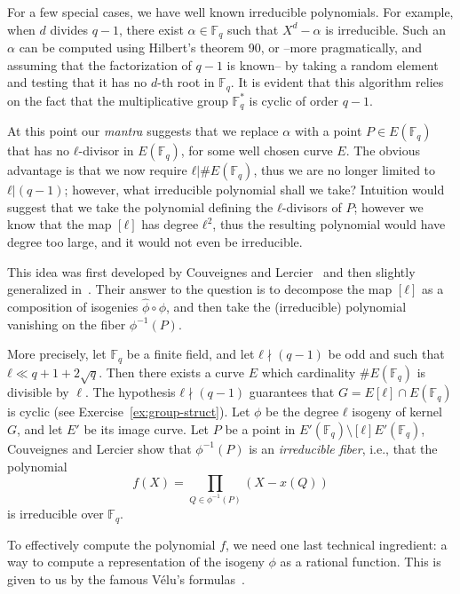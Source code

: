 \documentclass[10pt]{article}
\theoremstyle{plain}
\theoremstyle{definition}
\def\F{\ensuremath{\mathbb{F}}}
\begin{document}
For a few special cases, we have well known irreducible polynomials. %
For example, when $d$ divides $q-1$, there exist $α∈\F_q$ such that
$X^d-α$ is irreducible. %
Such an $α$ can be computed using Hilbert's theorem 90, or --more
pragmatically, and assuming that the factorization of $q-1$ is known--
by taking a random element and testing that it has no $d$-th root in
$\F_q$. %
It is evident that this algorithm relies on the fact that the
multiplicative group $\F_q^*$ is cyclic of order $q-1$.

At this point our \emph{mantra} suggests that we replace $α$ with a
point $P∈E(\F_q)$ that has no $ℓ$-divisor in $E(\F_q)$, for some well
chosen curve $E$. %
The obvious advantage is that we now require $ℓ|\#E(\F_q)$, thus we
are no longer limited to $ℓ|(q-1)$; however, what irreducible
polynomial shall we take? %
Intuition would suggest that we take the polynomial defining the
$ℓ$-divisors of $P$; however we know that the map $[ℓ]$ has degree
$ℓ^2$, thus the resulting polynomial would have degree too large, and
it would not even be irreducible.

This idea was first developed by Couveignes and
Lercier~\cite{couveignes+lercier11} and then slightly generalized
in~\cite{DeDoSc13}. %
Their answer to the question is to decompose the map $[ℓ]$ as a
composition of isogenies $\hat{ϕ}∘ϕ$, and then take the (irreducible)
polynomial vanishing on the fiber $ϕ^{-1}(P)$.

More precisely, let $\F_q$ be a finite field, and let $ℓ\nmid(q-1)$ be
odd and such that $ℓ\ll q+1+2\sqrt{q}$. %
Then there exists a curve $E$ which cardinality $\#E(\F_q)$ is
divisible by $\ell$. %
The hypothesis $ℓ\nmid(q-1)$ guarantees that $G = E[ℓ]∩E(\F_q)$ is
cyclic (see Exercise~\ref{ex:group-struct}). %
Let $ϕ$ be the degree $ℓ$ isogeny of kernel $G$, and let $E'$ be its
image curve. %
Let $P$ be a point in $E'(\F_q)\setminus [ℓ]E'(\F_q)$, Couveignes and
Lercier show that $\phi^{-1}(P)$ is an \emph{irreducible fiber}, i.e.,
that the polynomial
\[f(X) = \prod_{Q\in\phi^{-1}(P)}(X - x(Q))\]
is irreducible over $\F_q$.

To effectively compute the polynomial $f$, we need one last technical
ingredient: a way to compute a representation of the isogeny $ϕ$ as a
rational function. %
This is given to us by the famous V\'elu's formulas~\cite{velu71}.
\end{document}

